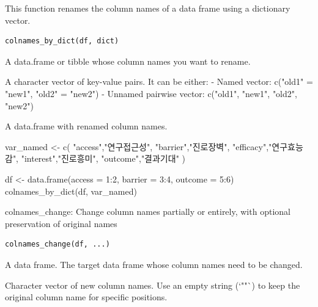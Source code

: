 \documentclass[a4paper]{book}
\begin{document}
%
\begin{Description}
This function renames the column names of a data frame using a dictionary vector.
\end{Description}
%
\begin{Usage}
\begin{verbatim}
colnames_by_dict(df, dict)
\end{verbatim}
\end{Usage}
%
\begin{Arguments}
\begin{ldescription}
\item[\code{df}] A data.frame or tibble whose column names you want to rename.

\item[\code{dict}] A character vector of key-value pairs.
It can be either:
- Named vector: c("old1" = "new1", "old2" = "new2")
- Unnamed pairwise vector: c("old1", "new1", "old2", "new2")
\end{ldescription}
\end{Arguments}
%
\begin{Value}
A data.frame with renamed column names.
\end{Value}
%
\begin{Examples}
\begin{ExampleCode}
var_named <- c(
  "access","연구접근성",
  "barrier","진로장벽",
  "efficacy","연구효능감",
  "interest","진로흥미",
  "outcome","결과기대"
)

df <- data.frame(access = 1:2, barrier = 3:4, outcome = 5:6)
colnames_by_dict(df, var_named)
\end{ExampleCode}
\end{Examples}
%
\begin{Description}
colnames\_change: Change column names partially or entirely, with optional preservation of original names
\end{Description}
%
\begin{Usage}
\begin{verbatim}
colnames_change(df, ...)
\end{verbatim}
\end{Usage}
%
\begin{Arguments}
\begin{ldescription}
\item[\code{df}] A data frame. The target data frame whose column names need to be changed.

\item[\code{...}] Character vector of new column names. Use an empty string (`""`) to keep the original column name for specific positions.
\end{ldescription}
\end{Arguments}
\end{document}
